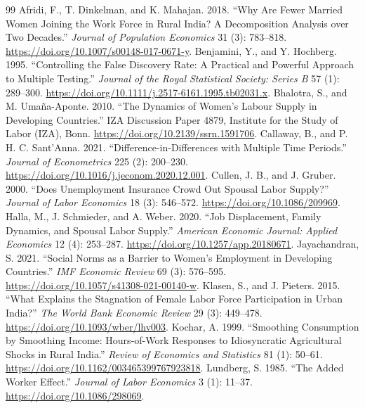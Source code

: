 \begin{thebibliography}{99}
 Afridi, F., T. Dinkelman, and K. Mahajan. 2018. ``Why Are Fewer Married Women Joining the Work Force in Rural India? A Decomposition Analysis over Two Decades.'' \textit{Journal of Population Economics} 31 (3): 783--818. \url{https://doi.org/10.1007/s00148-017-0671-y}.
 Benjamini, Y., and Y. Hochberg. 1995. ``Controlling the False Discovery Rate: A Practical and Powerful Approach to Multiple Testing.'' \textit{Journal of the Royal Statistical Society: Series B} 57 (1): 289--300. \url{https://doi.org/10.1111/j.2517-6161.1995.tb02031.x}.
 Bhalotra, S., and M. Uma\~na-Aponte. 2010. ``The Dynamics of Women's Labour Supply in Developing Countries.'' IZA Discussion Paper 4879, Institute for the Study of Labor (IZA), Bonn. \url{https://doi.org/10.2139/ssrn.1591706}.
 Callaway, B., and P. H. C. Sant'Anna. 2021. ``Difference-in-Differences with Multiple Time Periods.'' \textit{Journal of Econometrics} 225 (2): 200--230. \url{https://doi.org/10.1016/j.jeconom.2020.12.001}.
 Cullen, J. B., and J. Gruber. 2000. ``Does Unemployment Insurance Crowd Out Spousal Labor Supply?'' \textit{Journal of Labor Economics} 18 (3): 546--572. \url{https://doi.org/10.1086/209969}.
 Halla, M., J. Schmieder, and A. Weber. 2020. ``Job Displacement, Family Dynamics, and Spousal Labor Supply.'' \textit{American Economic Journal: Applied Economics} 12 (4): 253--287. \url{https://doi.org/10.1257/app.20180671}.
 Jayachandran, S. 2021. ``Social Norms as a Barrier to Women's Employment in Developing Countries.'' \textit{IMF Economic Review} 69 (3): 576--595. \url{https://doi.org/10.1057/s41308-021-00140-w}.
 Klasen, S., and J. Pieters. 2015. ``What Explains the Stagnation of Female Labor Force Participation in Urban India?'' \textit{The World Bank Economic Review} 29 (3): 449--478. \url{https://doi.org/10.1093/wber/lhv003}.
 Kochar, A. 1999. ``Smoothing Consumption by Smoothing Income: Hours-of-Work Responses to Idiosyncratic Agricultural Shocks in Rural India.'' \textit{Review of Economics and Statistics} 81 (1): 50--61. \url{https://doi.org/10.1162/003465399767923818}.
 Lundberg, S. 1985. ``The Added Worker Effect.'' \textit{Journal of Labor Economics} 3 (1): 11--37. \url{https://doi.org/10.1086/298069}.

\end{thebibliography}
